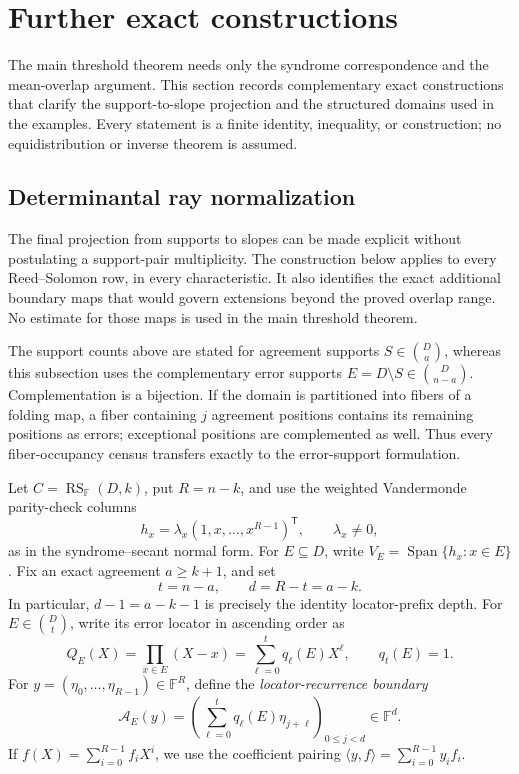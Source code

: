 \documentclass[11pt,a4paper]{amsart}
\numberwithin{equation}{section}
\theoremstyle{remark}
\DeclareMathOperator{\RS}{RS}
\DeclareMathOperator{\Span}{Span}
\newcommand{\F}{\mathbb F}
\begin{document}
\section{Further exact constructions}\label{sec:further-exact}

The main threshold theorem needs only the syndrome correspondence and the
mean-overlap argument.  This section records complementary exact
constructions that clarify the support-to-slope projection and the
structured domains used in the examples.  Every statement is a finite
identity, inequality, or construction; no equidistribution or inverse
theorem is assumed.

\subsection{Determinantal ray normalization}\label{drc:sec-determinantal-ray}

The final projection from supports to slopes can be made explicit without
postulating a support-pair multiplicity.  The construction below applies to
every Reed--Solomon row, in every characteristic.  It also identifies the
exact additional boundary maps that would govern extensions beyond the
proved overlap range.  No estimate for those maps is used in the main
threshold theorem.

The support counts above are stated for agreement supports
\(S\in\binom Da\), whereas this subsection uses the complementary error
supports \(E=D\setminus S\in\binom D{n-a}\).  Complementation is a
bijection.  If the domain is partitioned into fibers of a folding map, a
fiber containing \(j\) agreement positions contains its remaining positions
as errors; exceptional positions are complemented as well.  Thus every
fiber-occupancy census transfers exactly to the error-support formulation.

Let \(C=\RS_\F(D,k)\), put \(R=n-k\), and use the weighted Vandermonde
parity-check columns
\[
 h_x=\lambda_x(1,x,\ldots,x^{R-1})^{\mathsf T},
 \qquad \lambda_x\ne0,
\]
as in the syndrome--secant normal form.  For \(E\subseteq D\), write
\(V_E=\Span\{h_x:x\in E\}\).  Fix an exact agreement \(a\ge k+1\), and set
\[
             t=n-a,\qquad d=R-t=a-k.
             \tag{DR0}\label{drc:eq-depth}
\]
In particular, \(d-1=a-k-1\) is precisely the identity locator-prefix
depth.  For \(E\in\binom Dt\), write its error locator in ascending order as
\[
 Q_E(X)=\prod_{x\in E}(X-x)=\sum_{\ell=0}^{t}q_\ell(E)X^\ell,
 \qquad q_t(E)=1.
\]
For \(y=(\eta_0,\ldots,\eta_{R-1})\in\F^R\), define the
\emph{locator-recurrence boundary}
\[
 \mathcal A_E(y)=
 \left(\sum_{\ell=0}^{t}q_\ell(E)\eta_{j+\ell}\right)_{0\le j<d}
 \in\F^d.
 \tag{DR1}\label{drc:eq-recurrence-boundary}
\]
If \(f(X)=\sum_{i=0}^{R-1}f_iX^i\), we use the coefficient pairing
\(
 \langle y,f\rangle=\sum_{i=0}^{R-1}y_if_i
\).
\end{document}

